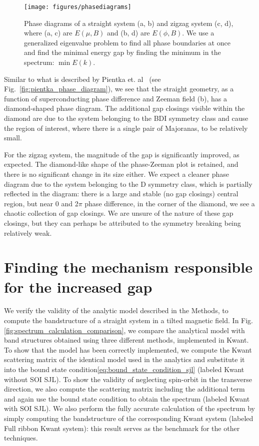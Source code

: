 			\begin{figure}[!htb]
			\centering
			\texttt{[image: figures/phasediagrams]}
			\caption{Phase diagrams of a straight system (a, b) and zigzag system (c, d), where (a, c) are $E(\mu, B)$ and (b, d) are $E(\phi, B)$.
			We use a generalized eigenvalue problem to find all phase boundaries at once and find the minimal energy gap by finding the minimum in the spectrum: $\min{E(k)}$.
			\label{fig:phasediagrams}}
			\end{figure}

			Similar to what is described by Pientka et. al~\cite{pientka2017topological} (see Fig.~\ref{fig:pientka_phase_diagram}), we see that the straight geometry, as a function of superconducting phase difference and Zeeman field (b), has a diamond-shaped phase diagram.
			The additional gap closings visible within the diamond are due to the system belonging to the BDI symmetry class and cause the region of interest, where there is a single pair of Majoranas, to be relatively small.
			
			For the zigzag system, the magnitude of the gap is significantly improved, as expected.
			The diamond-like shape of the phase-Zeeman plot is retained, and there is no significant change in its size either.
			We expect a cleaner phase diagram due to the system belonging to the D symmetry class, which is partially reflected in the diagram: there is a large and stable (no gap closings) central region, but near 0 and 2$\pi$ phase difference, in the corner of the diamond, we see a chaotic collection of gap closings.
			We are unsure of the nature of these gap closings, but they can perhaps be attributed to the symmetry breaking being relatively weak.



	\section{Finding the mechanism responsible for the increased gap}
		We verify the validity of the analytic model described in the Methods, to compute the bandstructure of a straight system in a tilted magnetic field. 
		In Fig.\ref{fig:spectrum_calculation_comparison}, we compare the analytical model with band structures obtained using three different methods, implemented in Kwant.
		To show that the model has been correctly implemented, we compute the Kwant scattering matrix of the identical model used in the analytics and substitute it into the bound state condition\eqref{eq:bound_state_condition_sjl} (labeled Kwant without SOI SJL).
		To show the validity of neglecting spin-orbit in the transverse direction, we also compute the scattering matrix including the additional term and again use the bound state condition to obtain the spectrum (labeled Kwant with SOI SJL).
		We also perform the fully accurate calculation of the spectrum by simply computing the bandstructure of the corresponding Kwant system (labeled Full ribbon Kwant system): this result serves as the benchmark for the other techniques.

